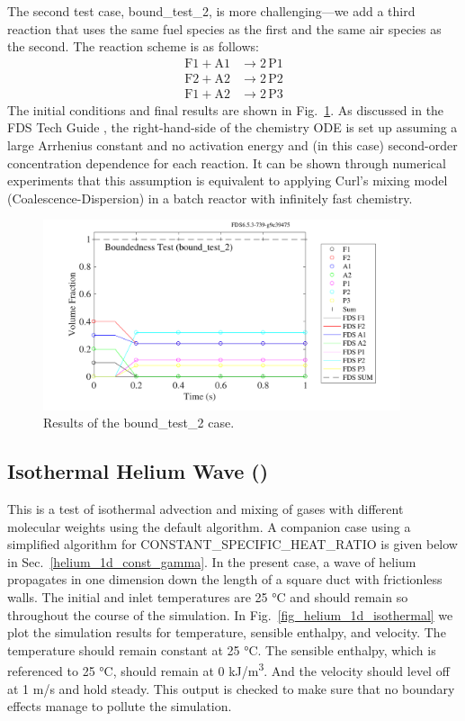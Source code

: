 \documentclass[11pt]{book}
\begin{document}
The second test case, {\ct bound\_test\_2}, is more challenging---we add a third reaction that uses the same fuel species as the first and the same air species as the second.  The reaction scheme is as follows:
\begin{align}
\mathrm{F1} + \mathrm{A1} &\rightarrow 2\,\mathrm{P1} \\
\mathrm{F2} + \mathrm{A2} &\rightarrow 2\,\mathrm{P2} \\
\mathrm{F1} + \mathrm{A2} &\rightarrow 2\,\mathrm{P3}
\end{align}
The initial conditions and final results are shown in Fig.~\ref{fig:bound_test_2}.  As discussed in the FDS Tech Guide \cite{FDS_Math_Guide}, the right-hand-side of the chemistry ODE is set up assuming a large Arrhenius constant and no activation energy and (in this case) second-order concentration dependence for each reaction.  It can be shown through numerical experiments that this assumption is equivalent to applying Curl's mixing model (Coalescence-Dispersion) \cite{Curl:1} in a batch reactor with infinitely fast chemistry.
\begin{figure}[!ht]
   \centering
   \includegraphics[height=2.2in]{SCRIPT_FIGURES/bound_test_2}
   \caption[Results of the {\ct bound\_test\_2} case]{Results of the {\ct bound\_test\_2} case.}
   \label{fig:bound_test_2}
\end{figure}

\subsection{Isothermal Helium Wave (\texorpdfstring{}{helium\_1d\_isothermal})}
\label{helium_1d_isothermal}
\label{helium_2d_isothermal}

This is a test of isothermal advection and mixing of gases with different molecular weights using the default algorithm.  A companion case using a simplified algorithm for {\ct CONSTANT\_SPECIFIC\_HEAT\_RATIO} is given below in Sec.~\ref{helium_1d_const_gamma}.  In the present case, a wave of helium propagates in one dimension down the length of a square duct with frictionless walls.  The initial and inlet temperatures are 25 \si{\degreeCelsius} and should remain so throughout the course of the simulation. In Fig.~\ref{fig_helium_1d_isothermal} we plot the simulation results for temperature, sensible enthalpy, and velocity.  The temperature should remain constant at 25 \si{\degreeCelsius}.  The sensible enthalpy, which is referenced to 25 \si{\degreeCelsius}, should remain at 0 \si{kJ/m^3}.  And the velocity should level off at 1 m/s and hold steady.  This output is checked to make sure that no boundary effects manage to pollute the simulation.
\end{document}
